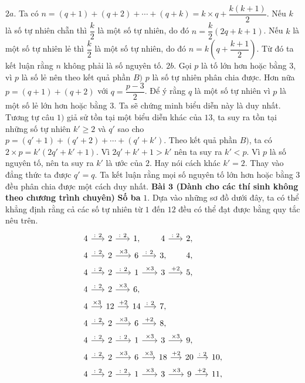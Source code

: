 \begin{multicols}{2}
	\vskip 0.1cm 
	$2a.$ Ta có $n=(q+1)+(q+2)+\cdots+(q+k)=k\times q+\dfrac{k(k+1)}{2}$. Nếu $k$ là số tự nhiên chẵn thì $\dfrac{k}{2}$ là một số tự nhiên, do đó $n=\dfrac{k}{2}(2q+k+1)$. Nếu $k$ là một số tự nhiên lẻ thì $\dfrac{k}{2}$ là một số tự nhiên, do đó $n=k(q+\dfrac{k+1}{2})$. Từ đó ta kết luận rằng $n$ không phải là số nguyên tố.
	\vskip 0.1cm 
	$2b$. Gọi $p$ là tố lớn hơn hoặc bằng $3$, vì $p$ là số lẻ nên theo kết quả phần $B)$ $p$ là số tự nhiên phân chia được. Hơn nữa $p=(q+1)+(q+2)$ với $q=\dfrac{p-3}{2}$. Để  ý rằng $q$ là một số tự nhiên vì $p$ là một số lẻ lớn hơn hoặc bằng $3$. Ta sẽ chứng minh biểu diễn này là duy nhất. Tương tự câu $1)$ giả sử tồn tại một biểu diễn khác của $13$, ta suy ra tồn tại những số tự nhiên $k'\ge 2$ và $q'$ sao cho $p=(q'+1)+(q'+2)+\cdots+(q'+k')$. Theo kết quả phần $B)$, ta có $2\times p=k'(2q'+k'+1)$. Vì $2q'+k'+1>k'$ nên ta suy ra $k'<p$. Vì $p$ là số nguyên tố, nên ta suy ra $k'$ là ước của $2$. Hay nói cách khác $k'=2$. Thay vào đẳng thức ta được $q'=q$. Ta kết luận rằng mọi số nguyên tố lớn hơn hoặc bằng $3$ đều phân chia được một cách duy nhất. 
	\vskip 0.1cm
	\textbf{\color{cackithi}Bài $\pmb{3}$ (Dành cho các thí sinh không theo chương trình chuyên)} 
	\vskip 0.1cm
	\textbf{\color{cackithi}Số ba}
	\vskip 0.1cm
	$1.$ Dựa vào những sơ đồ dưới đây, ta có thể khẳng định rằng cả các số tự nhiên từ $1$ đến $12$ đều có thể đạt được bằng quy tắc nêu trên. 
	\[\begin{tikzcd}[column sep = 1.35em]
		4 \arrow{r}{:\ 2}  & 2 \arrow{r}{:\ 2}& 1, &4 \arrow{r}{:\ 2}  & 2,\\[-3ex]
		4 \arrow{r}{:\ 2}  & 2 \arrow{r}{\times 3}& 6  \arrow{r}{:\  2} & 3, & 4,\\[-3ex]
		4 \arrow{r}{:\ 2}  & 2 \arrow{r}{:\ 2} &1 \arrow{r}{\times 3}& 3  \arrow{r}{+2} & 5,\\[-3ex]
		4 \arrow{r}{:\ 2}  & 2 \arrow{r}{\times 3}& 6,\\[-3ex]
		4 \arrow{r}{\times  3}  & 12 \arrow{r}{+ 2}& 14\arrow{r}{: \ 2 }& 7,\\[-3ex]
		4 \arrow{r}{:\  2}  & 2 \arrow{r}{\times 3}& 6 \arrow{r}{+2 }& 8,\\[-3ex]
		4 \arrow{r}{:\ 2}  & 2 \arrow{r}{:\ 2} &1 \arrow{r}{\times 3}& 3  \arrow{r}{\times 3} & 9, \\[-3ex]
		4 \arrow{r}{:\ 2}  & 2 \arrow{r}{\times 3} &6 \arrow{r}{\times 3}& 18  \arrow{r}{+ 2} & 20 \arrow{r}{:\ 2} & 10,\\[-3ex]
		4 \arrow{r}{:\ 2}  & 2 \arrow{r}{:\ 2} &1 \arrow{r}{\times 3}& 3  \arrow{r}{\times 3} & 9 \arrow{r}{+ 2} & 11,\\[-3ex]

\end{tikzcd}\]
\end{multicols}
